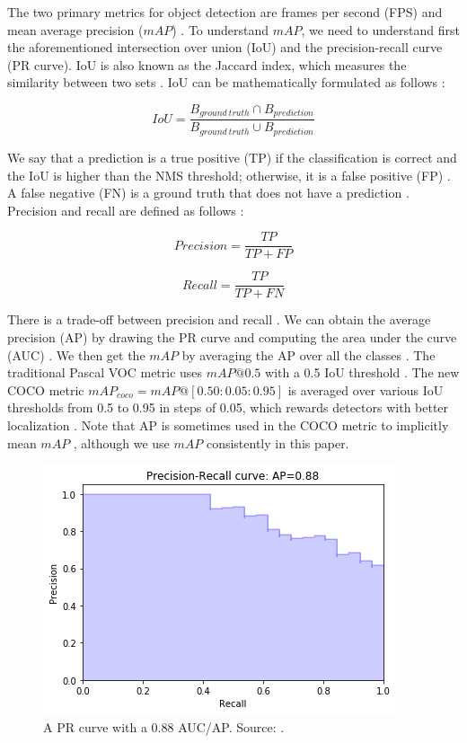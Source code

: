 \documentclass[a4paper, 11pt, oneside]{article}
\begin{document}
The two primary metrics for object detection are frames per second (FPS) and mean average precision ($mAP$)
\cite{elgendy2020deep, liu2020deep, geron2019hands, planche2019hands}. To understand $mAP$, we need to understand first
the aforementioned intersection over union (IoU) and the precision-recall curve (PR curve). IoU is also known as
the Jaccard index, which measures the similarity between two sets \cite{planche2019hands}. IoU can be mathematically
formulated as follows \cite{elgendy2020deep, planche2019hands}:

$$IoU = \frac{B_{ground \ truth} \cap B_{prediction}}{B_{ground \ truth} \cup B_{prediction}}$$

We say that a prediction is a true positive (TP) if the classification is correct and the IoU is higher than the NMS
threshold; otherwise, it is a false positive (FP) \cite{elgendy2020deep, liu2020deep, planche2019hands}. A false negative
(FN) is a ground truth that does not have a prediction \cite{planche2019hands}. Precision and recall are defined as
follows \cite{burkov2019hundred, davis2006relationship}:

$$Precision = \frac{TP}{TP + FP}$$

$$Recall = \frac{TP}{TP + FN}$$

There is a trade-off between precision and recall
\cite{elgendy2020deep, geron2019hands, burkov2019hundred, planche2019hands}. We can obtain the average precision
(AP) by drawing the PR curve and computing the area under the curve (AUC) \cite{elgendy2020deep, planche2019hands}.
We then get the $mAP$ by averaging the AP over all the classes \cite{elgendy2020deep, geron2019hands, planche2019hands}.
The traditional Pascal VOC metric uses $mAP@0.5$ with a 0.5 IoU threshold \cite{liu2020deep, everingham2010pascal}.
The new COCO metric $mAP_{coco} = mAP@[0.50:0.05:0.95]$ is averaged over
various IoU thresholds from 0.5 to 0.95 in steps of 0.05, which rewards detectors with better localization
\cite{liu2020deep, cocometrics}. Note that AP is sometimes used in the COCO metric to implicitly mean $mAP$
\cite{cocometrics}, although we use $mAP$ consistently in this paper.

\begin{figure}[ht]
  \begin{center}
    \includegraphics[width=.5\textwidth]{pr_curve.png}
  \end{center}
  \caption{A PR curve with a 0.88 AUC/AP. Source: \cite{planche2019hands}.}
\end{figure}
\end{document}
